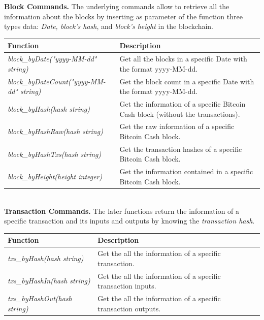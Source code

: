 \textbf{Block Commands.} The underlying commands allow to retrieve all the information about the 
blocks by inserting as parameter of the function three types data: \textit{Date, block's hash}, and \textit{block's height }in the blockchain.
\begin{table}[!ht]
    \centering
    \begin{tabular}{||l|p{6cm}||}
    \hline
    \textbf{Function}                          & \textbf{Description}                                                  \\ \hline
    \textit{block\_byDate("yyyy-MM-dd" string)}                 & Get all the blocks in a specific Date with the format yyyy-MM-dd.                          \\ \hline
    \textit{block\_byDateCount("yyyy-MM-dd" string)}    & Get the block count in a specific Date with the format yyyy-MM-dd.             \\ \hline
    \textit{block\_byHash(hash string)}                 & Get the information of a specific Bitcoin Cash block (without the transactions).         \\ \hline
    \textit{block\_byHashRaw(hash string)}              & Get the raw information of a specific Bitcoin Cash block.             \\ \hline
    \textit{block\_byHashTxs(hash string)}              & Get the transaction hashes of a specific Bitcoin Cash block.             \\ \hline
    \textit{block\_byHeight(height integer)}            & Get the information contained in a specific Bitcoin Cash block.                     \\ \hline
    \end{tabular}
    \end{table}\pagebreak\\
\textbf{Transaction Commands.} The later functions return the information of a specific transaction and its 
inputs and outputs by knowing the \textit{transaction hash}.
\begin{table}[!ht]
    \centering
    \begin{tabular}{||p{6.2cm}|p{6cm}||}
    \hline
    \textbf{Function}                          & \textbf{Description}                                                  \\ \hline
    \textit{txs\_byHash(hash string)}                   & Get the all the information of a specific transaction.                          \\ \hline
    \textit{txs\_byHashIn(hash string)}         & Get the all the information of a specific transaction inputs.      \\ \hline
    \textit{txs\_byHashOut(hash string)}                & Get the all the information of a specific transaction outputs.          \\ \hline
    \end{tabular}
    \end{table}\\
